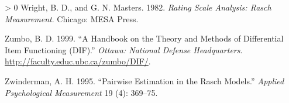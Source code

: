 \documentclass[
]{book}
\newlength{\cslhangindent}
\newenvironment{CSLReferences}[3] %
 {%
  \setlength{\parindent}{0pt}
  \ifodd #1 \everypar{\setlength{\hangindent}{\cslhangindent}}\ignorespaces\fi
  \ifnum #2 > 0
  \setlength{\parskip}{#2\baselineskip}
  \fi
 }%
 {}
\begin{document}
\begin{CSLReferences}{1}{0}
\leavevmode\hypertarget{ref-wright1982}{}%
Wright, B. D., and G. N. Masters. 1982. \emph{Rating Scale Analysis: Rasch Measurement}. Chicago: MESA Press.

\leavevmode\hypertarget{ref-zumbo1999}{}%
Zumbo, B. D. 1999. {``A Handbook on the Theory and Methods of Differential Item Functioning ({DIF}).''} \emph{Ottawa: National Defense Headquarters}. \url{http://faculty.educ.ubc.ca/zumbo/DIF/}.

\leavevmode\hypertarget{ref-zwinderman1995}{}%
Zwinderman, A. H. 1995. {``Pairwise Estimation in the Rasch Models.''} \emph{Applied Psychological Measurement} 19 (4): 369--75.

\end{CSLReferences}
\end{document}
